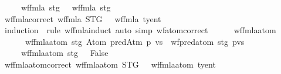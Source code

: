 \begin{isabellebody}
\ \ \ \ {\isacharbar}{\kern0pt}\ {\isachardoublequoteopen}wf{\isacharunderscore}{\kern0pt}fmla{\isacharprime}{\kern0pt}\ stg\ {\isacharparenleft}{\kern0pt}\isactrlbold {\isasymnot}{\isasymphi}{\isacharparenright}{\kern0pt}\ {\isasymlongleftrightarrow}\ wf{\isacharunderscore}{\kern0pt}fmla{\isacharprime}{\kern0pt}\ stg\ {\isasymphi}{\isachardoublequoteclose}\isanewline
\isanewline
\ \ \ \ \isamarkupfalse%
\ wf{\isacharunderscore}{\kern0pt}fmla{\isacharprime}{\kern0pt}{\isacharunderscore}{\kern0pt}correct{\isacharcolon}{\kern0pt}\ {\isachardoublequoteopen}wf{\isacharunderscore}{\kern0pt}fmla{\isacharprime}{\kern0pt}\ STG\ {\isasymphi}\ {\isasymlongleftrightarrow}\ wf{\isacharunderscore}{\kern0pt}fmla\ ty{\isacharunderscore}{\kern0pt}ent\ {\isasymphi}{\isachardoublequoteclose}\isanewline
%
\isadelimproof
\ \ \ \ \ \ %
\endisadelimproof
%
\isatagproof
{}\isamarkupfalse%
\ {\isacharparenleft}{\kern0pt}induction\ {\isasymphi}\ rule{\isacharcolon}{\kern0pt}\ wf{\isacharunderscore}{\kern0pt}fmla{\isachardot}{\kern0pt}induct{\isacharparenright}{\kern0pt}\ {\isacharparenleft}{\kern0pt}auto\ simp{\isacharcolon}{\kern0pt}\ wf{\isacharunderscore}{\kern0pt}atom{\isacharprime}{\kern0pt}{\isacharunderscore}{\kern0pt}correct{\isacharparenright}{\kern0pt}%
\endisatagproof
{\isafoldproof}%
%
\isadelimproof
\isanewline
%
\endisadelimproof
\isanewline
\ \ \ \ \isamarkupfalse%
\ wf{\isacharunderscore}{\kern0pt}fmla{\isacharunderscore}{\kern0pt}atom{}{\isacharprime}{\kern0pt}\ \isanewline
\ \ \ \ \ \ {\isachardoublequoteopen}wf{\isacharunderscore}{\kern0pt}fmla{\isacharunderscore}{\kern0pt}atom{}{\isacharprime}{\kern0pt}\ stg\ {\isacharparenleft}{\kern0pt}Atom\ {\isacharparenleft}{\kern0pt}predAtm\ p\ vs{\isacharparenright}{\kern0pt}{\isacharparenright}{\kern0pt}\ {\isasymlongleftrightarrow}\ wf{\isacharunderscore}{\kern0pt}pred{\isacharunderscore}{\kern0pt}atom{\isacharprime}{\kern0pt}\ stg\ {\isacharparenleft}{\kern0pt}p{\isacharcomma}{\kern0pt}vs{\isacharparenright}{\kern0pt}{\isachardoublequoteclose}\isanewline
\ \ \ \ {\isacharbar}{\kern0pt}\ {\isachardoublequoteopen}wf{\isacharunderscore}{\kern0pt}fmla{\isacharunderscore}{\kern0pt}atom{}{\isacharprime}{\kern0pt}\ stg\ {\isacharunderscore}{\kern0pt}\ {\isasymlongleftrightarrow}\ False{\isachardoublequoteclose}\isanewline
\isanewline
\ \ \ \ \isamarkupfalse%
\ wf{\isacharunderscore}{\kern0pt}fmla{\isacharunderscore}{\kern0pt}atom{}{\isacharprime}{\kern0pt}{\isacharunderscore}{\kern0pt}correct{\isacharcolon}{\kern0pt}\ {\isachardoublequoteopen}wf{\isacharunderscore}{\kern0pt}fmla{\isacharunderscore}{\kern0pt}atom{}{\isacharprime}{\kern0pt}\ STG\ {\isasymphi}\ {\isacharequal}{\kern0pt}\ wf{\isacharunderscore}{\kern0pt}fmla{\isacharunderscore}{\kern0pt}atom\ ty{\isacharunderscore}{\kern0pt}ent\ {\isasymphi}{\isachardoublequoteclose}\isanewline

\end{isabellebody}

